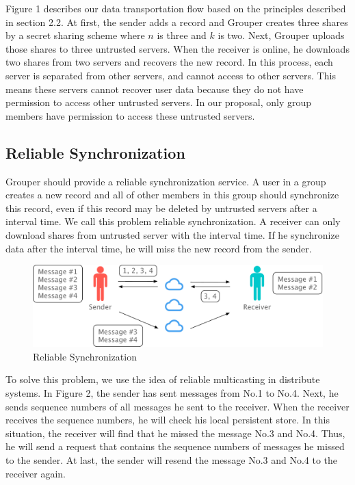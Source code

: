 \documentclass[twocolumn,10pt]{article}
\begin{document}
Figure 1 describes our data transportation flow based on the principles described in section 2.2. At first, the sender adds a record and Grouper creates three shares by a secret sharing scheme where $n$ is three and $k$ is two. Next, Grouper uploads those shares to three untrusted servers. When the receiver is online, he downloads two shares from two servers and recovers the new record. In this process, each server is separated from other servers, and cannot access to other servers. This means these servers cannot recover user data because they do not have permission to access other untrusted servers. In our proposal, only group members have permission to access these untrusted servers.

\subsection{Reliable Synchronization}
Grouper should provide a reliable synchronization service. A user in a group creates a new record and all of other members in this group should synchronize this record, even if this record may be deleted by untrusted servers after a interval time. We call this problem reliable synchronization. A receiver can only download shares from untrusted server with the interval time. If he synchronize data after the interval time, he will miss the new record from the sender.

\begin{figure}[t]
	\centering
	\includegraphics[scale=0.3]{reliable_sync}
	\caption{Reliable Synchronization}
\end{figure}

To solve this problem, we use the idea of reliable multicasting in distribute systems. In Figure 2, the sender has sent messages from No.1 to No.4. Next, he sends sequence numbers of all messages he sent to the receiver. When the receiver receives the sequence numbers, he will check his local persistent store. In this situation, the receiver will find that he missed the message No.3 and No.4. Thus, he will send a request that contains the sequence numbers of messages he missed to the sender. At last, the sender will resend the message No.3 and No.4 to the receiver again.
\end{document}
